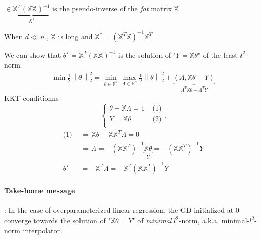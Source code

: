 $ \in \underbrace{\mathbb{X} ^T (\mathbb{X} \mathbb{X})^{-1}}_{X^\dagger} $ is the pseudo-inverse of the \textit{fat} matrix $ \mathbb{X} $ 
\begin{note}[]
    When $ d \ll n $ , $ \mathbb{X} $ is long and $ \mathbb{X}^{\dagger} = (\mathbb{X}^T \mathbb{X})^{-1} \mathbb{X} ^T $ 
\end{note}
We can show that $ \theta ^\star = \mathbb{X} ^T (\mathbb{X} \mathbb{X})^{-1} $ is the solution of "$ Y = \mathbb{X} \theta  $" of the least $ l^2 $-norm 
\begin{align*}
    \min  \frac{1 }{2} \left\| \theta  \right\| _2 ^2 = \min _{\theta \in \mathbb{R}^d} \max _{\Lambda \in \mathbb{R}^n} \frac{1 }{2} \left\| \theta  \right\| _2 ^2 + \underbrace{\left\langle \Lambda , \mathbb{X} \theta - Y \right\rangle }_{\Lambda ^T \mathbb{X} \theta - \Lambda ^T Y}
\end{align*}
KKT conditionns 
\[
    \begin{cases}
        \theta  + \mathbb{X} \Lambda =1  &\text{ (1)}\\
        Y = \mathbb{X} \theta &\text{ (2)}\\
    \end{cases} 
.\]
\begin{align*}
    \text{(1) } 
        &\Rightarrow \mathbb{X} \theta + \mathbb{X} \mathbb{X} ^T \Lambda = 0 \\
        &\Rightarrow \Lambda = - (\mathbb{X} \mathbb{X}^T)^{-1} \underbrace{\mathbb{X} \theta }_{Y} = - (\mathbb{X} \mathbb{X}^T)^{-1} Y \\
    \theta ^\star &= - \mathbb{X} ^T \Lambda = + \mathbb{X}^T (\mathbb{X} \mathbb{X}^T)^{-1} Y
\end{align*}

\paragraph{Take-home message}: In the case of overparameterized linear regression, the GD initialized at $ 0 $ converge towards the solution of "$ \mathbb{X} \theta = Y $" of \textit{minimal}  $ l^2 $-norm, a.k.a. minimal-$ l^2 $-norm interpolator.

